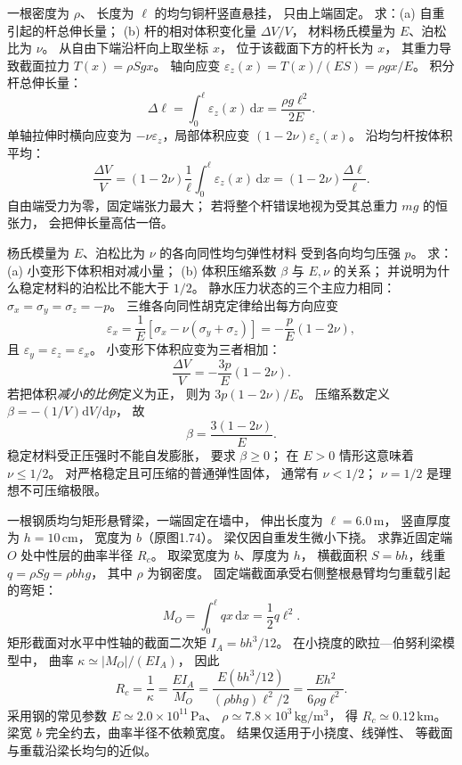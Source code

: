 一根密度为 $\rho$、
长度为 $\ell$ 的均匀铜杆竖直悬挂，
只由上端固定。
求：(a) 自重引起的杆总伸长量；
(b) 杆的相对体积变化量 $\Delta V/V$，
材料杨氏模量为 $E$、泊松比为 $\nu$。
\exsolution
从自由下端沿杆向上取坐标 $x$，
位于该截面下方的杆长为 $x$，
其重力导致截面拉力
$T(x)=\rho S g x$。
轴向应变
$\varepsilon_z(x)=T(x)/(ES)=\rho gx/E$。
积分杆总伸长量：
\[
\boxed{\Delta\ell=
\int_0^\ell\varepsilon_z(x)\,\mathrm dx
=\frac{\rho g\ell^2}{2E}}.
\]
单轴拉伸时横向应变为
$-\nu\varepsilon_z$，局部体积应变
$(1-2\nu)\varepsilon_z(x)$。
沿均匀杆按体积平均：
\[
\boxed{\frac{\Delta V}{V}
=(1-2\nu)\frac1\ell
\int_0^\ell\varepsilon_z(x)\,\mathrm dx
=(1-2\nu)\frac{\Delta\ell}{\ell}}.
\]
\excheck 自由端受力为零，固定端张力最大；
若将整个杆错误地视为受其总重力 $mg$ 的恒张力，
会把伸长量高估一倍。

杨氏模量为 $E$、泊松比为 $\nu$ 的各向同性均匀弹性材料
受到各向均匀压强 $p$。
求：(a) 小变形下体积相对减小量；
(b) 体积压缩系数 $\beta$ 与
$E,\nu$ 的关系；
并说明为什么稳定材料的泊松比不能大于 $1/2$。
\exsolution
静水压力状态的三个主应力相同：
$\sigma_x=\sigma_y=\sigma_z=-p$。
三维各向同性胡克定律给出每方向应变
\[
\varepsilon_x=
\frac1E[\sigma_x-\nu(\sigma_y+\sigma_z)]
=-\frac{p}{E}(1-2\nu),
\]
且 $\varepsilon_y=\varepsilon_z=\varepsilon_x$。
小变形下体积应变为三者相加：
\[
\boxed{\frac{\Delta V}{V}
=-\frac{3p}{E}(1-2\nu)}.
\]
若把体积\emph{减小的比例}定义为正，
则为 $3p(1-2\nu)/E$。
压缩系数定义
$\beta=-(1/V)\mathrm dV/\mathrm dp$，
故
\[
\boxed{\beta=\frac{3(1-2\nu)}{E}}.
\]
稳定材料受正压强时不能自发膨胀，
要求 $\beta\ge0$；
在 $E>0$ 情形这意味着
$\boxed{\nu\le1/2}$。
\excheck 对严格稳定且可压缩的普通弹性固体，
通常有 $\nu<1/2$；
$\nu=1/2$ 是理想不可压缩极限。

一根钢质均匀矩形悬臂梁，一端固定在墙中，
伸出长度为 $\ell=6.0\,\mathrm m$，
竖直厚度为 $h=10\,\mathrm{cm}$，
宽度为 $b$（原图1.74）。
梁仅因自重发生微小下挠。
求靠近固定端 $O$ 处中性层的曲率半径 $R_c$。
\exsolution
取梁宽度为 $b$、厚度为 $h$，
横截面积 $S=bh$，线重
$q=\rho S g=\rho b h g$，
其中 $\rho$ 为钢密度。
固定端截面承受右侧整根悬臂均匀重载引起的弯矩：
\[
M_O=\int_0^\ell q x\,\mathrm dx
=\frac12q\ell^2.
\]
矩形截面对水平中性轴的截面二次矩
$I_A=bh^3/12$。
在小挠度的欧拉—伯努利梁模型中，
曲率 $\kappa\simeq|M_O|/(EI_A)$，
因此
\[
R_c=\frac1\kappa
=\frac{EI_A}{M_O}
=\frac{E(bh^3/12)}{(\rho bhg)\ell^2/2}
=\boxed{\frac{Eh^2}{6\rho g\ell^2}}.
\]
采用钢的常见参数
$E\simeq2.0\times10^{11}\,\mathrm{Pa}$、
$\rho\simeq7.8\times10^3\,\mathrm{kg/m^3}$，
得
$\boxed{R_c\simeq0.12\,\mathrm{km}}$。
\excheck 梁宽 $b$ 完全约去，曲率半径不依赖宽度。
结果仅适用于小挠度、线弹性、
等截面与重载沿梁长均匀的近似。

